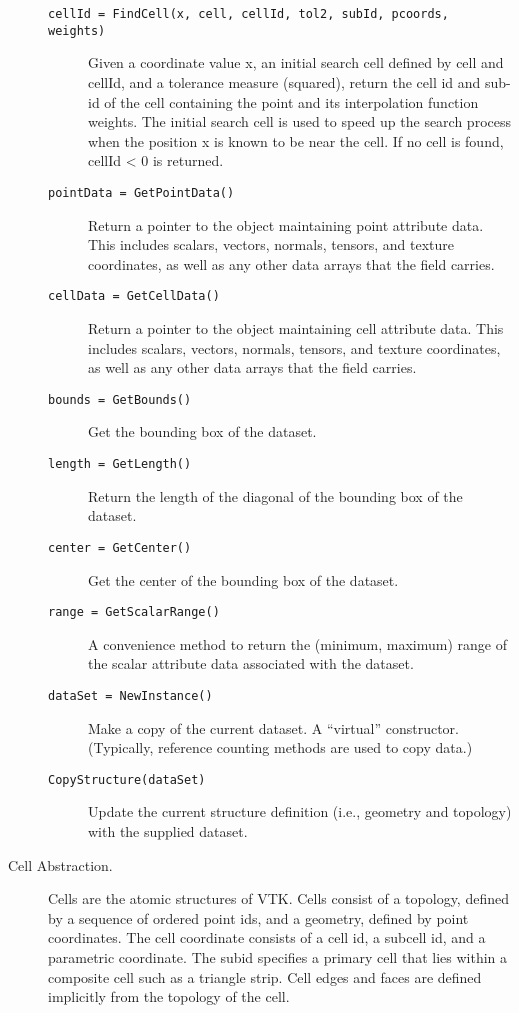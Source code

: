 \begin{description}
\begin{description}
    \item[\texttt{cellId = FindCell(x, cell, cellId, tol2, subId, pcoords, weights)}] 
    Given a coordinate value x, an initial search cell defined by cell and cellId, and a tolerance measure (squared), return the cell id and sub-id of the cell containing the point and its interpolation function weights. The initial search cell is used to speed up the search process when the position x is known to be near the cell. If no cell is found, cellId < 0 is returned.

    \item[\texttt{pointData = GetPointData()}]
    Return a pointer to the object maintaining point attribute data. This includes scalars, vectors, normals, tensors, and texture coordinates, as well as any other data arrays that the field carries.

    \item[\texttt{cellData = GetCellData()}]
    Return a pointer to the object maintaining cell attribute data. This includes scalars, vectors, normals, tensors, and texture coordinates, as well as any other data arrays that the field carries.

    \item[\texttt{bounds = GetBounds()}]
    Get the bounding box of the dataset.

    \item[\texttt{length = GetLength()}]
    Return the length of the diagonal of the bounding box of the dataset.

    \item[\texttt{center = GetCenter()}]
    Get the center of the bounding box of the dataset.

    \item[\texttt{range = GetScalarRange()}]
    A convenience method to return the (minimum, maximum) range of the scalar attribute data associated with the dataset.

    \item[\texttt{dataSet = NewInstance()}]
    Make a copy of the current dataset. A ``virtual'' constructor. (Typically, reference counting methods are used to copy data.)

    \item[\texttt{CopyStructure(dataSet)}]
    Update the current structure definition (i.e., geometry and topology) with the supplied dataset.
    \end{description}

\item[Cell Abstraction.\index{abstraction!cell|(}\index{cell!abstraction|(}] Cells are the atomic structures of VTK. Cells consist of a topology, defined by a sequence of ordered point ids, and a geometry, defined by point coordinates. The cell coordinate consists of a cell id, a subcell id, and a parametric coordinate. The subid specifies a primary cell that lies within a composite cell such as a triangle strip. Cell edges and faces are defined implicitly from the topology of the cell.
    \begin{description}


\end{description}
\end{description}
